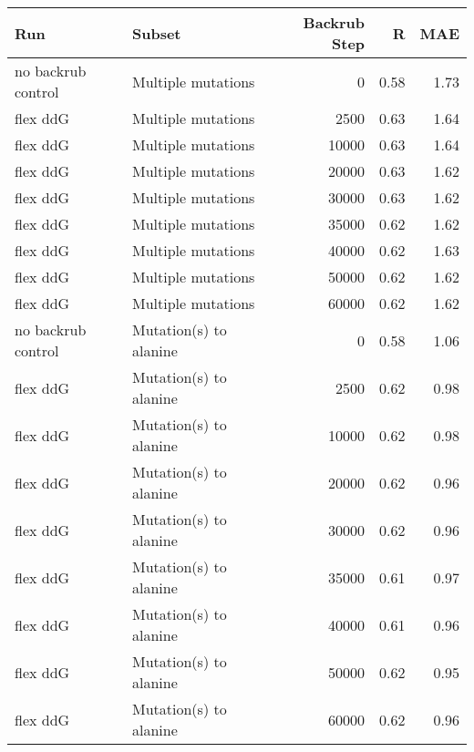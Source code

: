 \begin{table}
\begin{tabular}{llrrr}
\toprule
                Run &                               Subset &  Backrub Step &    R &  MAE \\
\midrule
 no backrub control &                   Multiple mutations &             0 & 0.58 & 1.73 \\
           flex ddG &                   Multiple mutations &          2500 & 0.63 & 1.64 \\
           flex ddG &                   Multiple mutations &         10000 & 0.63 & 1.64 \\
           flex ddG &                   Multiple mutations &         20000 & 0.63 & 1.62 \\
           flex ddG &                   Multiple mutations &         30000 & 0.63 & 1.62 \\
           flex ddG &                   Multiple mutations &         35000 & 0.62 & 1.62 \\
           flex ddG &                   Multiple mutations &         40000 & 0.62 & 1.63 \\
           flex ddG &                   Multiple mutations &         50000 & 0.62 & 1.62 \\
           flex ddG &                   Multiple mutations &         60000 & 0.62 & 1.62 \\
 no backrub control &               Mutation(s) to alanine &             0 & 0.58 & 1.06 \\
           flex ddG &               Mutation(s) to alanine &          2500 & 0.62 & 0.98 \\
           flex ddG &               Mutation(s) to alanine &         10000 & 0.62 & 0.98 \\
           flex ddG &               Mutation(s) to alanine &         20000 & 0.62 & 0.96 \\
           flex ddG &               Mutation(s) to alanine &         30000 & 0.62 & 0.96 \\
           flex ddG &               Mutation(s) to alanine &         35000 & 0.61 & 0.97 \\
           flex ddG &               Mutation(s) to alanine &         40000 & 0.61 & 0.96 \\
           flex ddG &               Mutation(s) to alanine &         50000 & 0.62 & 0.95 \\
           flex ddG &               Mutation(s) to alanine &         60000 & 0.62 & 0.96 \\

\end{tabular}
\end{table}
